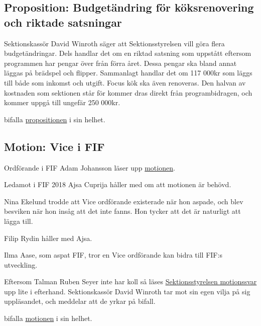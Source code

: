 \documentclass[hidelinks]{sektionsmote}
\begin{document}
\subsection{Proposition: Budgetändring för köksrenovering och riktade satsningar}
Sektionskassör David Winroth säger att Sektionsstyrelsen vill göra flera budgetändringar.
Dels handlar det om en riktad satsning som uppstått eftersom programmen har pengar över från förra året.
Dessa pengar ska bland annat läggas på brädspel och flipper.
Sammanlagt handlar det om 117 000kr som läggs till både som inkomst och utgift.
Focus kök ska även renoveras.
Den halvan av kostnaden som sektionen står för kommer dras direkt från programbidragen, och kommer uppgå till ungefär 250 000kr.

\begin{beslut}
  \item bifalla \hyperlink{bilagor/prop/e.pdf.1}{propositionen} i sin helhet.
\end{beslut}


\subsection{Motion: Vice i FIF}
Ordförande i FIF Adam Johansson läser upp \hyperlink{bilagor/motion/c.pdf.1}{motionen}.

Ledamot i FIF 2018 Ajsa Cuprija håller med om att motionen är behövd.

Nina Ekelund trodde att Vice ordförande existerade när hon aspade, och blev besviken när hon insåg att det inte fanns.
Hon tycker att det är naturligt att lägga till.

Filip Rydin håller med Ajsa.

Ilma Aase, som aspat FIF, tror en Vice ordförande kan bidra till FIF:s utveckling.

Eftersom Talman Ruben Seyer inte har koll så läses \hyperlink{bilagor/motion/csvar.pdf.1}{Sektionsstyrelsen motionssvar} upp lite i efterhand.
Sektionskassör David Winroth tar mot sin egen vilja på sig uppläsandet, och meddelar att de yrkar på bifall.

\begin{beslut}\label{beslut:vice-fif-bifall}
  \item bifalla \hyperlink{bilagor/motion/c.pdf.1}{motionen} i sin helhet.
\end{beslut}
\end{document}
